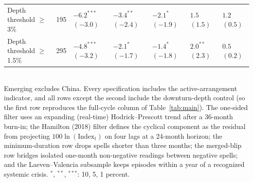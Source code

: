\begin{table}[H]
\begin{tabularx}{\textwidth}{@{}lcYYYYY@{}}
Depth threshold $\ge$3\% & 195 & $-6.2^{***}${\scriptsize$(-3.0)$} & $-3.4^{**}${\scriptsize$(-2.4)$} & $-2.1^{*}${\scriptsize$(-1.9)$} & $1.5${\scriptsize$(1.5)$} & $1.2${\scriptsize$(0.5)$} \\
Depth threshold $\ge$1.5\% & 295 & $-4.8^{***}${\scriptsize$(-3.2)$} & $-2.1^{*}${\scriptsize$(-1.7)$} & $-1.4^{*}${\scriptsize$(-1.8)$} & $2.0^{**}${\scriptsize$(2.3)$} & $0.5${\scriptsize$(0.2)$} \\
\bottomrule
\end{tabularx}
\\[2pt]\footnotesize{Emerging excludes China. Every specification includes the active-arrangement indicator, and all rows except the second include the downturn-depth control (so the first row reproduces the full-cycle column of Table~\ref{tab:main}). The one-sided filter uses an expanding (real-time) Hodrick--Prescott trend after a 36-month burn-in; the Hamilton (2018) filter defines the cyclical component as the residual from projecting $100\ln(\text{Index}_t)$ on four lags at a 24-month horizon; the minimum-duration row drops spells shorter than three months; the merged-blip row bridges isolated one-month non-negative readings between negative spells; and the Laeven--Valencia subsample keeps episodes within a year of a recognized systemic crisis. $^{*}$, $^{**}$, $^{***}$: 10, 5, 1 percent.}
\end{table}
